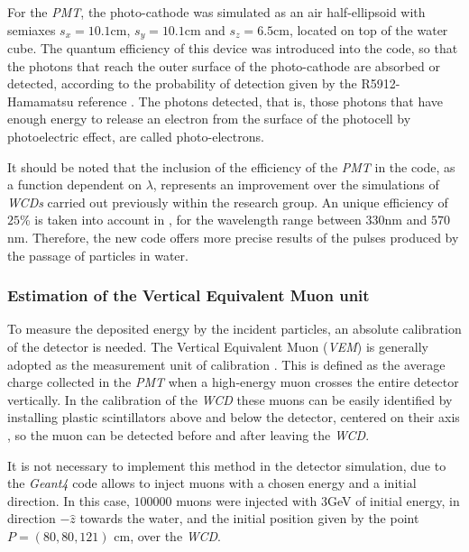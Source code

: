 \documentclass[submitting]{nst}
\begin{document}
For the \textsl{PMT}, the photo-cathode was simulated as an air half-ellipsoid with semiaxes $s_x=10.1$cm, $ s_y = 10.1$cm and $s_z=6.5$cm, located on top of the water cube. The quantum efficiency of this device was introduced into the code, so that the photons that reach the outer surface of the photo-cathode are absorbed or detected, according to the probability of detection given by the R5912-Hamamatsu reference \cite{Hamamatsu2018}. The photons detected, that is, those photons that have enough energy to release an electron from the surface of the photocell by photoelectric effect, are called photo-electrons.
 
It should be noted that the inclusion of the efficiency of the \textsl{PMT} in the code, as a function dependent on $\lambda$, represents an improvement over the simulations of \textsl{WCDs} carried out previously within the research group. An unique efficiency of $25$\% is taken into account in \cite{CalderonAsoreyNunez2015}, for the wavelength range between $330$nm and $570$nm. Therefore, the new code offers more precise results of the pulses produced by the passage of particles in water. 
 
 \subsubsection{Estimation of the Vertical Equivalent Muon unit}
 To measure the deposited energy by the incident particles, an absolute calibration of the detector is needed. The Vertical Equivalent Muon (\textsl{VEM}) is generally adopted as the measurement unit of calibration \cite{EtchegoyenEtal2005}. This is defined as the average charge collected in the \textsl{PMT} when a high-energy muon crosses the entire detector vertically. In the calibration of the \textsl{WCD} these muons can be easily identified by installing plastic scintillators above and below the detector, centered on their axis \cite{EtchegoyenEtal2005}, so the muon can be detected before and after leaving the \textsl{WCD}.
 
It is not necessary to implement this method in the detector simulation, due to the \textsl{Geant4} code allows to inject muons with a chosen energy and a initial direction. In this case, $100000$ muons were injected with $3$GeV of initial energy, in direction $-\hat{z}$ towards the water, and the initial position given by the point $ P=(80, 80, 121)$ cm, over the \textsl{WCD}. 
\end{document}
